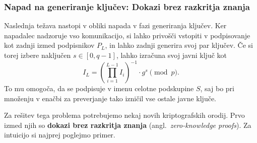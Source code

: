 \documentclass[isrm2, tisk]{fmfdelo}
\begin{document}
\subsubsection{Napad na generiranje ključev: Dokazi brez razkritja znanja}
Naslednja težava nastopi v obliki napada v fazi generiranja ključev. Ker napadalec nadzoruje vso komunikacijo, 
si lahko privošči vstopiti v podpisovanje kot zadnji izmed podpisnikov $P_L$, in lahko zadnji generira svoj
par ključev. Če si torej izbere naključen $s \in [0, q- 1]$, lahko izračuna svoj javni ključ kot 
$$ 
I_L = \left( \prod_{i=1}^{L-1} I_i \right)^{-1} \cdot g^s \pmod p.
$$
To mu omogoča, da se podpisuje v imenu celotne podskupine $S$, saj bo pri množenju v enačbi za preverjanje
tako izničil vse ostale javne ključe.

Za rešitev tega problema potrebujemo nekaj novih kriptografskih orodij. Prvo izmed njih so 
\textbf{dokazi brez razkritja znanja} (angl.\ \textit{zero-knowledge proofs}). Za intuicijo si najprej 
poglejmo primer. 
\end{document}
